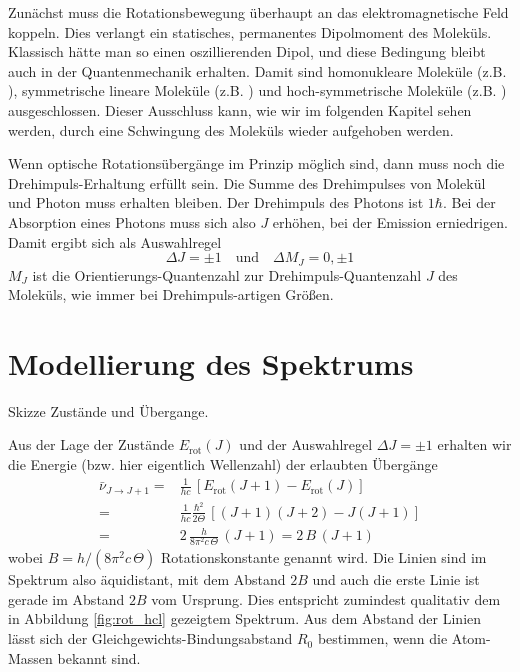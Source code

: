Zunächst muss die Rotationsbewegung überhaupt an das elektromagnetische Feld koppeln. Dies verlangt  ein statisches, permanentes Dipolmoment des Moleküls. Klassisch hätte man so einen oszillierenden Dipol, und diese Bedingung bleibt auch in der Quantenmechanik erhalten. Damit sind homonukleare Moleküle (z.B. ), symmetrische lineare Moleküle (z.B. ) und hoch-symmetrische Moleküle (z.B. ) ausgeschlossen. Dieser Ausschluss kann, wie wir im folgenden Kapitel sehen werden, durch eine Schwingung des Moleküls wieder aufgehoben werden.

Wenn optische Rotationsübergänge im Prinzip möglich sind, dann muss noch die Drehimpuls-Erhaltung erfüllt sein. Die Summe des Drehimpulses von Molekül und Photon muss erhalten bleiben. Der Drehimpuls des Photons ist $1 \hbar$. Bei der Absorption eines Photons muss sich also $J$ erhöhen, bei der Emission erniedrigen. Damit ergibt sich als Auswahlregel
\begin{equation}
\Delta J = \pm 1 \quad \text{und} \quad \Delta M_J = 0, \pm 1
\end{equation}
$M_J$ ist die Orientierungs-Quantenzahl zur Drehimpuls-Quantenzahl $J$ des Moleküls, wie immer bei Drehimpuls-artigen Größen.

\section{Modellierung des Spektrums}

\begin{marginfigure}
\caption{Skizze Zustände und Übergange.}
\end{marginfigure}


Aus der Lage der Zustände $E_\text{rot}(J)$ und der Auswahlregel $\Delta J = \pm 1$ erhalten wir die  Energie (bzw. hier eigentlich Wellenzahl) der erlaubten Übergänge
\begin{align}
 \bar{\nu}_{J \rightarrow J + 1} =& \frac{1}{h c}  \, \left[ E_\text{rot}(J+1) - E_\text{rot}(J) \right]
 \\ 
 =  & \frac{1}{h c}\frac{\hbar^2}{2 \Theta} \, \left[ (J+1)(J+2) - J (J+1) \right] \\
 = & 2 \, \frac{h}{8 \pi^2 c \, \Theta} \, \left( J +1 \right) = 2 \, B \, (J+1)
\end{align}
wobei $B = h / (8 \pi^2 c \, \Theta)$ Rotationskonstante genannt wird. Die Linien sind im Spektrum also äquidistant, mit dem Abstand $2B$ und auch die erste Linie ist gerade im Abstand $2B$ vom Ursprung. Dies entspricht zumindest qualitativ dem in Abbildung \ref{fig:rot_hcl} gezeigtem Spektrum. Aus dem Abstand der Linien lässt sich der Gleichgewichts-Bindungsabstand $R_0$ bestimmen, wenn die Atom-Massen bekannt sind.



